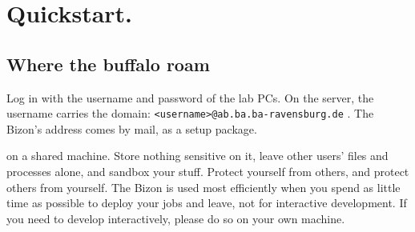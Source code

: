 %

\chapter{Quickstart.}

\section{Where the buffalo roam}

 Log in
with the username and password of the lab PCs. On the server, the
username carries the domain: \texttt{<username>@ab.ba.ba-ravensburg.de}
\cite{dhbw2021bizon}. The Bizon's address comes by mail, as a setup package.

 on
a shared machine. Store nothing sensitive on it, leave other users' files
and processes alone, and sandbox your stuff.
Protect yourself from others, and protect others from yourself.
%
The Bizon is used most efficiently when you spend as little time as possible to deploy your jobs and leave,
not for interactive development. If you need to develop interactively, please do so on your own machine.

